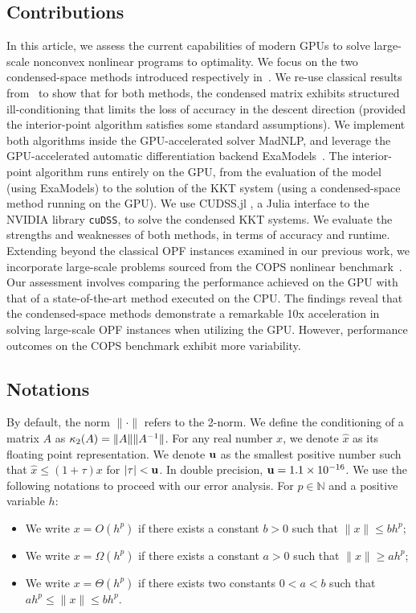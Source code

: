 \subsection{Contributions}
In this article, we assess the current capabilities of modern GPUs
to solve large-scale nonconvex nonlinear programs to optimality.
We focus on the two condensed-space methods
introduced respectively in~\cite{regev2023hykkt,shin2023accelerating}.
We re-use classical results from~\cite{wright1998ill} to show
that for both methods, the condensed matrix exhibits
structured ill-conditioning that limits the loss of accuracy in
the descent direction (provided the interior-point algorithm satisfies
some standard assumptions).
We implement both algorithms inside the GPU-accelerated solver MadNLP,
and leverage the GPU-accelerated automatic differentiation
backend ExaModels~\cite{shin2023accelerating}.
The interior-point algorithm runs entirely on the GPU, from
the evaluation of the model (using ExaModels) to the solution of
the KKT system (using a condensed-space method running on the GPU).
We use CUDSS.jl \cite{Montoison_CUDSS}, a Julia interface to the NVIDIA library {\tt cuDSS},
to solve the condensed KKT systems. We evaluate the strengths
and weaknesses of both methods, in terms of accuracy and runtime.
Extending beyond the classical OPF instances examined in our previous work, we incorporate large-scale problems sourced from the COPS nonlinear benchmark~\cite{dolan2004benchmarking}.
Our assessment involves comparing the performance achieved on the GPU with that of a state-of-the-art method executed on the CPU.
The findings reveal that the condensed-space methods demonstrate a remarkable 10x acceleration in solving large-scale OPF instances when utilizing the GPU.
However, performance outcomes on the COPS benchmark exhibit more variability.

\subsection{Notations}
By default, the norm $\|\cdot\|$ refers to the 2-norm.
We define the conditioning of a matrix $A$ as
$\kappa_2(A) = \| A \| \|A^{-1} \|$.
For any real number $x$, we denote $\widehat{x}$ as its floating
point representation.
We denote $\mathbf{u}$ as the smallest positive number such that
$\widehat{x} \leq (1 + \tau) x$ for $|\tau| < \mathbf{u}$.
In double precision, $\mathbf{u} = 1.1 \times 10^{-16}$.
We use the following notations to proceed with our error analysis.
For $p \in \mathbb{N}$ and a positive variable $h$:
\begin{itemize}
  \item We write $x = O(h^p)$ if there exists a constant $b > 0$
    such that $\| x \| \leq b h^p$;
  \item We write $x = \Omega(h^p)$ if there exists a constant $a > 0$
    such that $\| x \| \geq a h^p$;
  \item We write $x = \Theta(h^p)$ if there exists two constants $0 < a < b$
    such that $a h^p \leq \| x \| \leq b h^p$.
\end{itemize}

